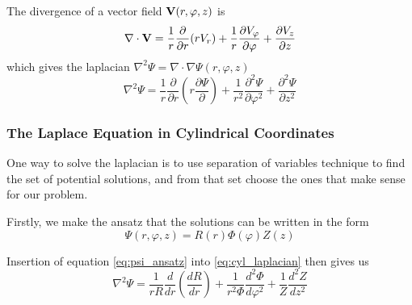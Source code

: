 The divergence of a vector field $\vb{V}(r, \varphi, z)$ is
\begin{equation}
    \nabla \cdot \vb{V} = \frac{1}{r} \frac{\partial}{\partial r} (rV_r)
    + \frac{1}{r} \frac{\partial V_\varphi}{\partial \varphi}
    + \frac{\partial V_z}{\partial z}
    \label{eq:cyldiv}
\end{equation}
which gives the laplacian $\nabla^2 \Psi = \nabla \cdot \nabla \Psi (r, \varphi, z)$
\begin{equation}
    \nabla^2 \Psi =
    \frac{1}{r} \frac{\partial}{\partial r} \left(r\frac{\partial \Psi}{\partial}\right)
    + \frac{1}{r^2} \frac{\partial^2 \Psi}{\partial \varphi^2}
    + \frac{\partial^2 \Psi}{\partial z^2}
    \label{eq:cyl_laplacian}
\end{equation}
\cite[Ch.3.13]{russenschuck_field_2011}
\subsubsection{The Laplace Equation in Cylindrical Coordinates}
One way to solve the laplacian is to use separation of variables
technique to find the set of potential solutions, and from that
set choose the ones that make sense for our problem.

Firstly, we make the ansatz that the solutions can be written in
the form
\begin{equation}
    \Psi(r, \varphi, z) = R(r)\varPhi(\varphi)Z(z)
    \label{eq:psi_ansatz}
\end{equation}

Insertion of equation \ref{eq:psi_ansatz} into \ref{eq:cyl_laplacian}
then gives us
\begin{equation}
    \nabla^2 \Psi = \frac{1}{rR} \frac{d}{dr} \left(\frac{dR}{dr} \right)
    + \frac{1}{r^2 \varPhi} \frac{d^2 \varPhi}{d\varphi^2}
    + \frac{1}{Z} \frac{d^2 Z}{dz^2}
    \label{eq:sepLaplacian}
\end{equation}

